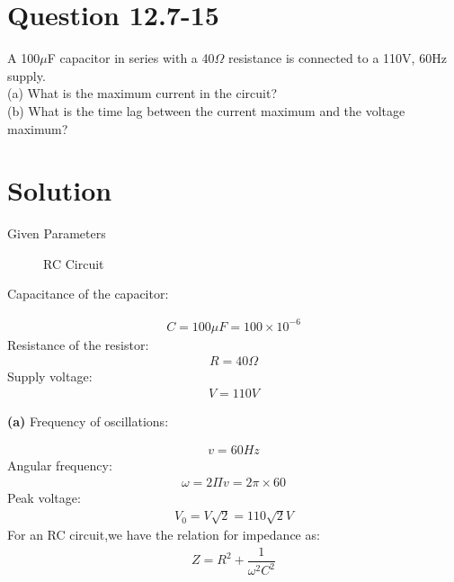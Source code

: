 \documentclass[journal,12pt,twocolumn]{IEEEtran}
\theoremstyle{remark}
\begin{document}
\section{Question 12.7-15}
A 100$\mu$F capacitor in series with a 40$\Omega$ resistance is
connected to a 110V, 60Hz supply.\\
(a) What is the maximum current in the circuit?\\
(b) What is the time lag between the current maximum and the voltage maximum?\\
\section{Solution}
\begin{table}[!h]
	\centering
	
	\vspace{6 pt}
	\caption{Given Parameters}
	\label{tab:enter-label}
\end{table}
\begin{figure}[!h]
	\centering
	
	\caption{RC Circuit}
	\label{fig:1}
\end{figure}
\begin{flushleft}
Capacitance of the capacitor:
\end{flushleft}
\begin{align}
\label{eq:tri-pts/1}C=100\mu F =100 \times 10^{-6}
\end{align}
Resistance of the resistor:
\begin{align}
\label{eq:tri-pts/2}R=40\Omega
\end{align}
Supply voltage:
\begin{align}
\label{eq:tri-pts/3}V=110V
\end{align}
\begin{flushleft}
\textbf{(a)} Frequency of oscillations:
\end{flushleft}
\begin{align}
\label{eq:tri-pts/4}v=60Hz
\end{align}
Angular frequency:
\begin{align}
\label{eq:tri-pts/5} \omega =2\Pi v =2\pi \times 60
\end{align}
Peak voltage:
\begin{align}
\label{eq:tri-pts/6}V_0=V\sqrt{2}=110\sqrt{2}V
\end{align}
For an RC circuit,we have the relation for impedance as:
\begin{align}
	\label{eq:tri-pts/7} Z=R^2 + \dfrac{1}{\omega^2C^2}
\end{align}
\end{document}
